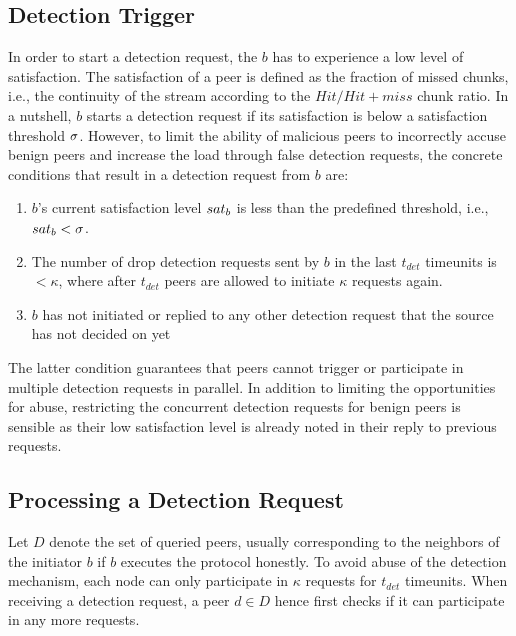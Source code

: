 \subsection{Detection Trigger}
\label{Detection-Trigger}


In order to start a detection request, the $b$ has to experience a low level of satisfaction. 
The satisfaction of a peer is defined as the fraction of missed chunks, i.e., the continuity of the stream according to the $Hit/Hit+miss$ chunk ratio. 
In a nutshell, $b$ starts a detection request if its satisfaction is below a satisfaction threshold $\sigma$.
However, to limit the ability of malicious peers to incorrectly accuse benign peers and increase the load through false detection requests, the concrete conditions that result in a detection request from $b$ are: 
\begin{enumerate}
 \item $b$'s current satisfaction level $sat_b$ is less than the predefined threshold, i.e., $sat_b < \sigma$.
 \item The number of drop detection requests sent by $b$ in the last $t_{det}$ timeunits is $< \kappa$, where after $t_{det}$ peers are allowed to initiate $\kappa$ requests again. 
 \item $b$ has not initiated or replied to any other \drop detection request that the source has not decided on yet
\end{enumerate}
The latter condition guarantees that peers cannot trigger or participate in multiple detection requests in parallel. In addition to limiting the opportunities for abuse, restricting the concurrent detection requests for benign peers is sensible as their low satisfaction level is already noted in their reply to previous requests. 

\subsection{Processing a Detection Request}
Let $D$ denote the set of queried peers, usually corresponding to the neighbors of the initiator $b$ if $b$ executes the protocol honestly.  
To avoid abuse of the detection mechanism, each node can only participate in $\kappa$ requests for $t_{det}$ timeunits. 
When receiving a detection request, a peer $d \in D$ hence first checks if it can participate in any more requests.    
    
